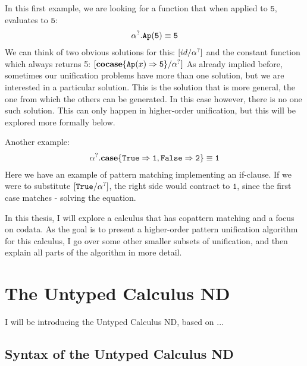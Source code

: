 \documentclass[twoside,12pt,a4paper]{article}
\begin{document}
\begin{example}
    In this first example, we are looking for a function that when applied to $\mathtt{5}$, evaluates to $\mathtt{5}$:
    \begin{align*}
        &\alpha^?.\texttt{Ap}(\mathtt{5}) \equiv \mathtt{5}\\
    \end{align*}
    We can think of two obvious solutions for this: $[id / \alpha^?]$ and the constant function which always returns 5: $[\textbf{cocase}\{\texttt{Ap}(x)\Rightarrow \mathtt{5}\} / \alpha^?]$
    As already implied before, sometimes our unification problems have more than one solution, 
    but we are interested in a particular solution. This is the solution that is more general, the one from which the others can be generated.
    In this case however, there is no one such solution. This can only happen in higher-order unification, but this will be explored more formally below.
    
    Another example:
    \begin{align*}
    \alpha^?.\textbf{case}\{\mathtt{True \Rightarrow 1, False \Rightarrow 2}\}\equiv \mathtt{1}
    \end{align*}
    Here we have an example of pattern matching implementing an if-clause.
    If we were to substitute $[\mathtt{True / \alpha^?}]$, the right side would contract to $\mathtt{1}$,
    since the first case matches - solving the equation.
\end{example}

In this thesis, I will explore a calculus that has copattern matching and a focus on codata.
As the goal is to present a higher-order pattern unification algorithm for this calculus,
I go over some other smaller subsets of unification, and then explain all parts of the algorithm in more detail.

\section{The Untyped Calculus ND}

I will be introducing the Untyped Calculus ND, based on ... %

\subsection{Syntax of the Untyped Calculus ND}
\end{document}
